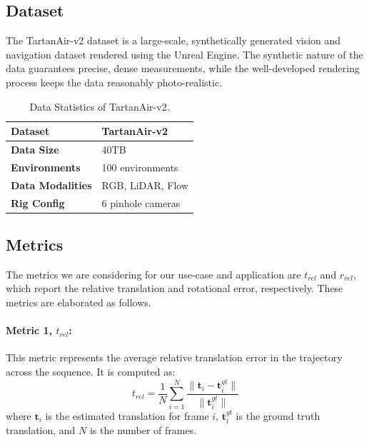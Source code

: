 \documentclass[11pt,a4paper]{article}
\begin{document}
\subsection{Dataset}

The TartanAir-v2 dataset is a large-scale, synthetically generated vision and navigation dataset rendered using the Unreal Engine. The synthetic nature of the data guarantees precise, dense measurements, while the well-developed rendering process keeps the data reasonably photo-realistic.\\

\begin{table}[h!]
\centering
\begin{tabular}{|l|l|}
\hline
\textbf{Dataset}         & \textbf{TartanAir-v2}                                                      \\ \hline
\textbf{Data Size}         & 40TB                                                                      \\ \hline
\textbf{Environments}      & 100 environments \\ \hline
\textbf{Data Modalities}   & RGB, LiDAR, Flow                                                        \\ \hline
\textbf{Rig Config} & 6 pinhole cameras          \\ \hline
\end{tabular}
\caption{Data Statistics of TartanAir-v2.}
\label{tab:tartanairv2_stats}
\end{table}

\subsection{Metrics}

The metrics we are considering for our use-case and application are \textit{$t_{rel}$} and \textit{$r_{rel}$}, which report the relative translation and rotational error, respectively. These metrics are elaborated as follows.

\paragraph{\textbf{Metric 1,   }\textit{$t_{rel}$}:}
This metric represents the average relative translation error in the trajectory across the sequence. It is computed as:
\[
t_{rel} = \frac{1}{N} \sum_{i=1}^{N} \frac{\|\mathbf{t}_i - \mathbf{t}_i^{gt}\|}{\|\mathbf{t}_i^{gt}\|}
\]
where $\mathbf{t}_i$ is the estimated translation for frame $i$, $\mathbf{t}_i^{gt}$ is the ground truth translation, and $N$ is the number of frames.
\end{document}

